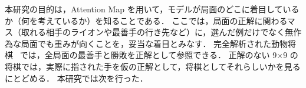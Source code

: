 \documentclass[submit]{ipsj}
\begin{document}
本研究の目的は，Attention Map を用いて，モデルが局面のどこに着目しているか（何を考えているか）を知ることである．
ここでは，局面の正解に関わるマス（取れる相手のライオンや最善手の行き先など）に，選んだ例だけでなく無作為な局面でも重みが向くことを，妥当な着目とみなす．
完全解析された動物将棋~\cite{tanaka2009} では，全局面の最善手と勝敗を正解として参照できる．
正解のない 9×9 の将棋では，実際に指された手を仮の正解として，将棋としてそれらしいかを見るにとどめる．
本研究では次を行った．
\end{document}
